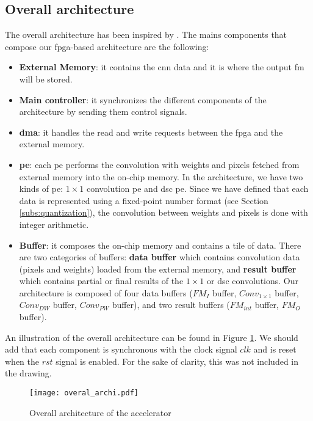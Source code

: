\subsection{Overall architecture} \label{subsec:overal}
%
The overall architecture has been inspired by \textcite{zhu_efficient_2020}. The mains components that compose our \acrshort{fpga}-based architecture are the following:
%
\begin{itemize}
    \item \textbf{External Memory}: it contains the \acrshort{cnn} data and it is where the output \acrshort{fm} will be stored.
    \item \textbf{Main controller}: it synchronizes the different components of the architecture by sending them control signals.
    \item \textbf{\acrfull{dma}}: it handles the read and write requests between the \acrshort{fpga} and the external memory.
    \item \textbf{\acrshort{pe}}: each \acrshort{pe} performs the convolution with weights and pixels fetched from external memory into the on-chip memory. In the architecture, we have two kinds of \acrshort{pe}: $1 \times 1$ convolution \acrshort{pe} and \acrshort{dsc} \acrshort{pe}. Since we have defined that each data is represented using a fixed-point number format (see Section \ref{subs:quantization}), the convolution between weights and pixels is done with integer arithmetic.
    \item \textbf{Buffer}: it composes the on-chip memory and contains a tile of data. There are two categories of buffers: \textbf{data buffer} which contains convolution data (pixels and weights) loaded from the external memory, and \textbf{result buffer} which contains partial or final results of the $1 \times 1$ or \acrshort{dsc} convolutions. Our architecture is composed of four data buffers ($FM_{I}$ buffer, $Conv_{1 \times 1}$ buffer, $Conv_{DW}$ buffer, $Conv_{PW}$ buffer), and two result buffers ($FM_{int}$ buffer, $FM_{O}$ buffer).
\end{itemize}
%
An illustration of the overall architecture can be found in Figure \ref{fig:overal_archi}. We should add that each component is synchronous with the clock signal $clk$ and is reset when the $rst$ signal is enabled. For the sake of clarity, this was not included in the drawing.
%
\begin{figure}[H]
    \centering
    \texttt{[image: overal\_archi.pdf]}
    \caption{Overall architecture of the accelerator}
    \label{fig:overal_archi}
\end{figure}
%


